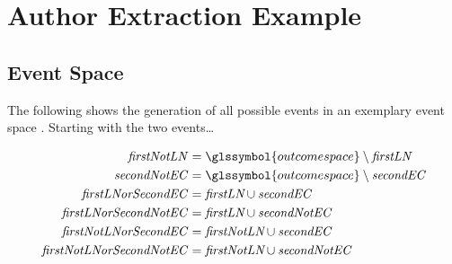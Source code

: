 \chapter{Author Extraction Example}\label{app:cha-author-extraction-example}

\section{Event Space}\label{app:sec-event-space}

The following shows the generation of all possible events in an exemplary \gls{event space} .
Starting with the two events\dots{}

\begin{equation*}
  \begin{split}
    \mathit{firstNotLN}&=\glssymbol{outcome space}\setminus\textit{firstLN}\\
    \mathit{secondNotEC}&=\glssymbol{outcome space}\setminus\textit{secondEC}\\
    \mathit{firstLNorSecondEC}&=\textit{firstLN}\cup\textit{secondEC}\\
    \mathit{firstLNorSecondNotEC}&=\textit{firstLN}\cup\textit{secondNotEC}\\
    \mathit{firstNotLNorSecondEC}&=\textit{firstNotLN}\cup\textit{secondEC}\\
    \mathit{firstNotLNorSecondNotEC}&=\textit{firstNotLN}\cup\textit{secondNotEC}\\
  \end{split}
\end{equation*}

